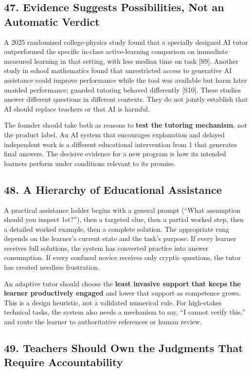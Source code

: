 \subsection*{47. Evidence Suggests Possibilities, Not an Automatic Verdict}

A 2025 randomized college-physics study found that a specially designed AI tutor outperformed the specific in-class active-learning comparison on immediate measured learning in that setting, with less median time on task [S9]. Another study in school mathematics found that unrestricted access to generative AI assistance could improve performance while the tool was available but harm later unaided performance; guarded tutoring behaved differently [S10]. These studies answer different questions in different contexts. They do not jointly establish that AI should replace teachers or that AI is harmful.

The founder should take both as reasons to \textbf{test the tutoring mechanism}, not the product label. An AI system that encourages explanation and delayed independent work is a different educational intervention from 1 that generates final answers. The decisive evidence for a new program is how its intended learners perform under conditions relevant to its promise.

\subsection*{48. A Hierarchy of Educational Assistance}

A practical assistance ladder begins with a general prompt (``What assumption should you inspect 1st?''), then a targeted clue, then a partial worked step, then a detailed worked example, then a complete solution. The appropriate rung depends on the learner's current state and the task's purpose. If every learner receives full solutions, the system has converted practice into answer consumption. If every confused novice receives only cryptic questions, the tutor has created needless frustration.

An adaptive tutor should choose the \textbf{least invasive support that keeps the learner productively engaged} and lower that support as competence grows. This is a design heuristic, not a validated numerical rule. For high-stakes technical tasks, the system also needs a mechanism to say, ``I cannot verify this,'' and route the learner to authoritative references or human review.

\subsection*{49. Teachers Should Own the Judgments That Require Accountability}


